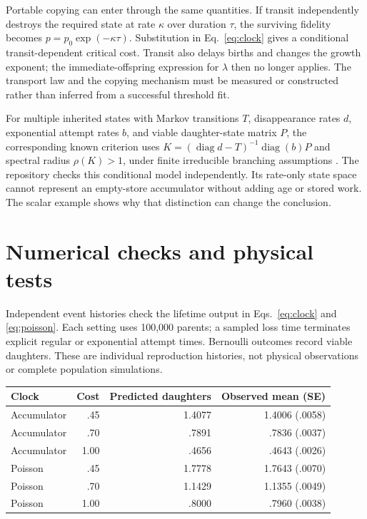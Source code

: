 \documentclass[11pt,a4paper]{article}
\begin{document}
Portable copying can enter through the same quantities. If transit independently
destroys the required state at rate $\kappa$ over duration $\tau$, the surviving
fidelity becomes $p=p_0\exp(-\kappa\tau)$. Substitution in Eq.~\eqref{eq:clock}
gives a conditional transit-dependent critical cost. Transit also delays births
and changes the growth exponent; the immediate-offspring expression for $\lambda$
then no longer applies. The transport law and the copying mechanism must be
measured or constructed rather than inferred from a successful threshold fit.

For multiple inherited states with Markov transitions $T$, disappearance rates
$d$, exponential attempt rates $b$, and viable daughter-state matrix $P$, the
corresponding known criterion uses
$K=(\operatorname{diag}d-T)^{-1}\operatorname{diag}(b)P$ and spectral radius
$\rho(K)>1$, under finite irreducible branching assumptions \cite{branching}.
The repository checks this conditional model independently. Its rate-only state
space cannot represent an empty-store accumulator without adding age or stored
work. The scalar example shows why that distinction can change the conclusion.

\section{Numerical checks and physical tests}

Independent event histories check the lifetime output in Eqs.~\eqref{eq:clock}
and \eqref{eq:poisson}. Each setting uses 100,000 parents; a sampled loss time
terminates explicit regular or exponential attempt times. Bernoulli outcomes
record viable daughters. These are individual reproduction histories, not physical
observations or complete population simulations.

\begin{center}
\begin{tabular}{@{}lrrr@{}}
\toprule
Clock & Cost & Predicted daughters & Observed mean (SE)\\
\midrule
Accumulator & .45 & 1.4077 & 1.4006 (.0058)\\
Accumulator & .70 & .7891 & .7836 (.0037)\\
Accumulator & 1.00 & .4656 & .4643 (.0026)\\
Poisson & .45 & 1.7778 & 1.7643 (.0070)\\
Poisson & .70 & 1.1429 & 1.1355 (.0049)\\
Poisson & 1.00 & .8000 & .7960 (.0038)\\
\bottomrule
\end{tabular}
\end{center}
\end{document}
